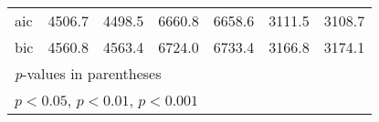 {\begin{tabular}{l*{6}{c}}
aic                 &      4506.7         &      4498.5         &      6660.8         &      6658.6         &      3111.5         &      3108.7         \\
bic                 &      4560.8         &      4563.4         &      6724.0         &      6733.4         &      3166.8         &      3174.1         \\
\hline\hline
\multicolumn{7}{l}{\footnotesize \textit{p}-values in parentheses}\\
\multicolumn{7}{l}{\footnotesize \sym{*} \(p<0.05\), \sym{**} \(p<0.01\), \sym{***} \(p<0.001\)}\\
\end{tabular}
}
